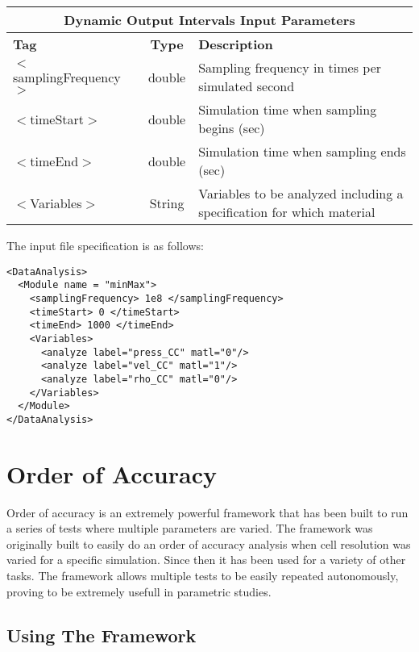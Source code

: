 \begin{center}
\begin{tabular}{| l | c | p{7cm} |}
\hline
  \multicolumn{3}{|c|}{\textbf{Dynamic Output Intervals Input Parameters}} \\
\hline
\hline
  \textbf{Tag} & \textbf{Type} & \textbf{Description}\\
\hline
  $<$samplingFrequency$>$ & double & Sampling frequency in times per simulated second\\
\hline
  $<$timeStart$>$ & double & Simulation time when sampling begins (sec)\\
\hline
  $<$timeEnd$>$ & double & Simulation time when sampling ends (sec)\\
\hline
  $<$Variables$>$ & String & Variables to be analyzed including a specification for which material\\
\hline
\end{tabular}
\end{center}


The input file specification is as follows:
\begin{verbatim}
<DataAnalysis>
  <Module name = "minMax">
    <samplingFrequency> 1e8 </samplingFrequency>
    <timeStart> 0 </timeStart>
    <timeEnd> 1000 </timeEnd>
    <Variables>
      <analyze label="press_CC" matl="0"/>
      <analyze label="vel_CC" matl="1"/>
      <analyze label="rho_CC" matl="0"/>
    </Variables>
  </Module>
</DataAnalysis>
\end{verbatim}

\chapter{Order of Accuracy}
\label{chap:OA}

Order of accuracy is an extremely powerful framework that has been built to run a series of tests where multiple parameters are varied. The framework was originally built to easily do an order of accuracy analysis when cell resolution was varied for a specific simulation. Since then it has been used for a variety of other tasks. The framework allows multiple tests to be easily repeated autonomously, proving to be extremely usefull in parametric studies.

\section{Using The Framework}

\iffalse
The first step in using the framework, is to set up the tests you wish to run. All the scripts this framework uses are located inside $\TT{/src/orderAccuracy/framwork\_scripts}$ contains all the scripts the framework uses to run, $\TT{postProcessTools}$ contains all the post processing scripts the study will use, and $\TT{test\_config\_files}$ contains all the studies which the framework can run. The framework has the ability to run any of .tst files located here. \\
\fi

